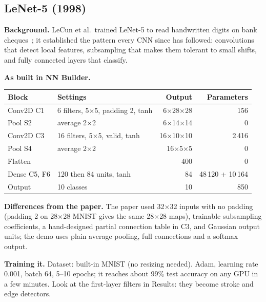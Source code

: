 \documentclass[11pt,a4paper]{article}
\begin{document}
\subsection{LeNet-5 (1998)}
\textbf{Background.} LeCun et al.\ trained LeNet-5 to read handwritten digits on bank cheques~\cite{lecun1998gradient}; it established the
pattern every CNN since has followed: convolutions that detect local features, subsampling that makes them tolerant to small shifts, and
fully connected layers that classify.

\textbf{As built in NN Builder.}
\begin{center}
\begin{tabular}{@{}llrr@{}}
\toprule
\textbf{Block} & \textbf{Settings} & \textbf{Output} & \textbf{Parameters}\\
\midrule
Conv2D C1 & 6 filters, 5$\times$5, padding 2, tanh & 6$\times$28$\times$28 & 156\\
Pool S2 & average 2$\times$2 & 6$\times$14$\times$14 & 0\\
Conv2D C3 & 16 filters, 5$\times$5, valid, tanh & 16$\times$10$\times$10 & 2\,416\\
Pool S4 & average 2$\times$2 & 16$\times$5$\times$5 & 0\\
Flatten & & 400 & 0\\
Dense C5, F6 & 120 then 84 units, tanh & 84 & 48\,120 + 10\,164\\
Output & 10 classes & 10 & 850\\
\bottomrule
\end{tabular}
\end{center}
\textbf{Differences from the paper.} The paper used 32$\times$32 inputs with no padding (padding 2 on 28$\times$28 MNIST gives the same
28$\times$28 maps), trainable subsampling coefficients, a hand-designed partial connection table in C3, and Gaussian output units; the
demo uses plain average pooling, full connections and a softmax output.

\textbf{Training it.} Dataset: built-in MNIST (no resizing needed). Adam, learning rate 0.001, batch 64, 5--10 epochs; it reaches about
99\% test accuracy on any GPU in a few minutes. Look at the first-layer filters in Results: they become stroke and edge detectors.

\end{document}
